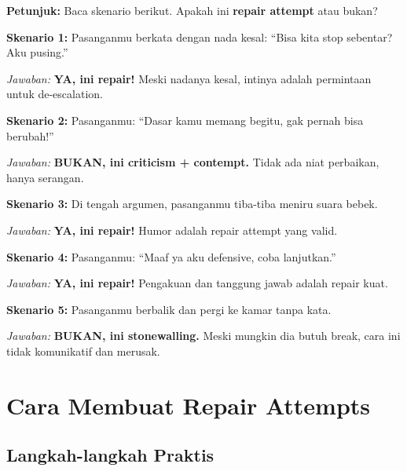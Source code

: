 \begin{exercisebox}
\textbf{Petunjuk:} Baca skenario berikut. Apakah ini \textbf{repair attempt} atau bukan?

\textbf{Skenario 1:}
Pasanganmu berkata dengan nada kesal: ``Bisa kita stop sebentar? Aku pusing.''

\textit{Jawaban:} \textbf{YA, ini repair!} Meski nadanya kesal, intinya adalah permintaan untuk de-escalation.

\textbf{Skenario 2:}
Pasanganmu: ``Dasar kamu memang begitu, gak pernah bisa berubah!''

\textit{Jawaban:} \textbf{BUKAN, ini criticism + contempt.} Tidak ada niat perbaikan, hanya serangan.

\textbf{Skenario 3:}
Di tengah argumen, pasanganmu tiba-tiba meniru suara bebek.

\textit{Jawaban:} \textbf{YA, ini repair!} Humor adalah repair attempt yang valid.

\textbf{Skenario 4:}
Pasanganmu: ``Maaf ya aku defensive, coba lanjutkan.''

\textit{Jawaban:} \textbf{YA, ini repair!} Pengakuan dan tanggung jawab adalah repair kuat.

\textbf{Skenario 5:}
Pasanganmu berbalik dan pergi ke kamar tanpa kata.

\textit{Jawaban:} \textbf{BUKAN, ini stonewalling.} Meski mungkin dia butuh break, cara ini tidak komunikatif dan merusak.
\end{exercisebox}

\section{Cara Membuat Repair Attempts}

\subsection{Langkah-langkah Praktis}

